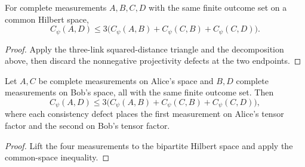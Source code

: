 \begin{lemma}
\label{lem:complete-measurement-consistency-triangle-common-space}
	\leanok
	For complete measurements $A,B,C,D$ with the same finite outcome set on a
	common Hilbert space,
	\[
		C_\psi(A,D)\le
		3\bigl(C_\psi(A,B)+C_\psi(C,B)+C_\psi(C,D)\bigr).
	\]
\end{lemma}
\begin{proof}
	\leanok
	Apply the three-link squared-distance triangle and the decomposition above,
	then discard the nonnegative projectivity defects at the two endpoints.
\end{proof}

\begin{lemma}
\label{lem:complete-measurement-consistency-triangle-bipartite}
	\leanok
	Let $A,C$ be complete measurements on Alice's space and $B,D$ complete
	measurements on Bob's space, all with the same finite outcome set.  Then
	\[
		C_\psi(A,D)\le
		3\bigl(C_\psi(A,B)+C_\psi(C,B)+C_\psi(C,D)\bigr),
	\]
	where each consistency defect places the first measurement on Alice's tensor
	factor and the second on Bob's tensor factor.
\end{lemma}
\begin{proof}
	\leanok
	Lift the four measurements to the bipartite Hilbert space and apply the
	common-space inequality.
\end{proof}

